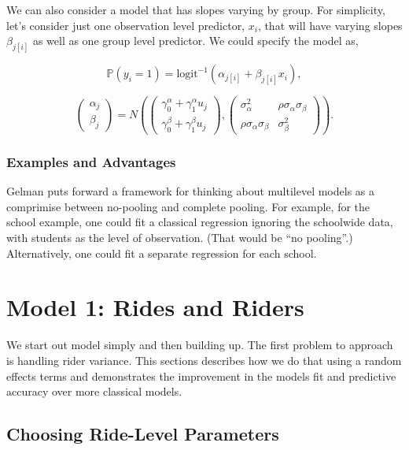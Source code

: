 \documentclass[12pt,twoside]{reedthesis}
\begin{document}
  We can also consider a model that has slopes varying by group. For
  simplicity, let's consider just one observation level predictor,
  \(x_i\), that will have varying slopes \(\beta_{j[i]}\) as well as one
  group level predictor. We could specify the model as,
  
  \[\mathbb{P} (y_i = 1) = \text{logit}^{-1}
  (\alpha_{j[i]} + \beta_{j[i]} x_i),\]
  
  \[
  \left(
  \begin{array}{c}
  \alpha_{j}\\
  \beta_{j}
  \end{array}
  \right) =
  N \left(
  \left(
  \begin{array}{c}
  \gamma_0^\alpha + \gamma_1^\alpha u_j\\
  \gamma_0^\beta + \gamma_1^\beta u_j
  \end{array}
  \right),
  \left(
  \begin{array}{cc}
  \sigma^2_\alpha & \rho \sigma_\alpha \sigma_\beta\\
  \rho \sigma_\alpha \sigma_\beta & \sigma^2_\beta
  \end{array}
  \right)
  \right).
  \]
  
  \subsection{Examples and Advantages}\label{examples-and-advantages}
  
  Gelman puts forward a framework for thinking about multilevel models as
  a comprimise between no-pooling and complete pooling. For example, for
  the school example, one could fit a classical regression ignoring the
  schoolwide data, with students as the level of observation. (That would
  be ``no pooling''.) Alternatively, one could fit a separate regression
  for each school.
  
  \chapter{Model 1: Rides and Riders}\label{model-1-rides-and-riders}
  
  We start out model simply and then building up. The first problem to
  approach is handling rider variance. This sections describes how we do
  that using a random effects terms and demonstrates the improvement in
  the models fit and predictive accuracy over more classical models.
  
  \section{Choosing Ride-Level
  Parameters}\label{choosing-ride-level-parameters}
  
\end{document}
